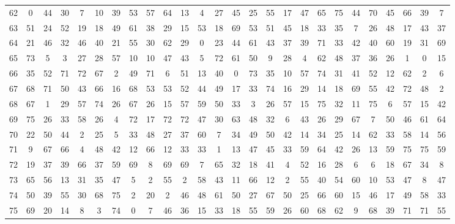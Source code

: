 \begin{table}
\begin{tabular}{c c c c c c c c c c c c c c c c c c c c c c c c c c }
62 & 0 & 44 & 30 & 7 & 10 & 39 & 53 & 57 & 64 & 13 & 4 & 27 & 45 & 25 & 55 & 17 & 47 & 65 & 75 & 44 & 70 & 45 & 66 & 39 & 7 \\
63 & 51 & 24 & 52 & 19 & 18 & 49 & 61 & 38 & 29 & 15 & 53 & 18 & 69 & 53 & 51 & 45 & 18 & 33 & 35 & 7 & 26 & 48 & 17 & 43 & 37 \\
64 & 21 & 46 & 32 & 46 & 40 & 21 & 55 & 30 & 62 & 29 & 0 & 23 & 44 & 61 & 43 & 37 & 39 & 71 & 33 & 42 & 40 & 60 & 19 & 31 & 69 \\
65 & 73 & 5 & 3 & 27 & 28 & 57 & 10 & 10 & 47 & 43 & 5 & 72 & 61 & 50 & 9 & 28 & 4 & 62 & 48 & 37 & 36 & 26 & 1 & 0 & 15 \\
66 & 35 & 52 & 71 & 72 & 67 & 2 & 49 & 71 & 6 & 51 & 13 & 40 & 0 & 73 & 35 & 10 & 57 & 74 & 31 & 41 & 52 & 12 & 62 & 2 & 6 \\
67 & 68 & 71 & 50 & 43 & 66 & 16 & 68 & 53 & 53 & 52 & 44 & 49 & 17 & 33 & 74 & 16 & 29 & 14 & 18 & 69 & 55 & 42 & 72 & 48 & 2 \\
68 & 67 & 1 & 29 & 57 & 74 & 26 & 67 & 26 & 15 & 57 & 59 & 50 & 33 & 3 & 26 & 57 & 15 & 75 & 32 & 11 & 75 & 6 & 57 & 15 & 42 \\
69 & 75 & 26 & 33 & 58 & 26 & 4 & 72 & 17 & 72 & 72 & 47 & 30 & 63 & 48 & 32 & 6 & 43 & 26 & 29 & 67 & 7 & 50 & 46 & 61 & 64 \\
70 & 22 & 50 & 44 & 2 & 25 & 5 & 33 & 48 & 27 & 37 & 60 & 7 & 34 & 49 & 50 & 42 & 14 & 34 & 25 & 14 & 62 & 33 & 58 & 14 & 56 \\
71 & 9 & 67 & 66 & 4 & 48 & 42 & 12 & 66 & 12 & 33 & 33 & 1 & 13 & 47 & 45 & 33 & 59 & 64 & 42 & 26 & 13 & 59 & 75 & 75 & 59 \\
72 & 19 & 37 & 39 & 66 & 37 & 59 & 69 & 8 & 69 & 69 & 7 & 65 & 32 & 18 & 41 & 4 & 52 & 16 & 28 & 6 & 6 & 18 & 67 & 34 & 8 \\
73 & 65 & 56 & 13 & 31 & 35 & 47 & 5 & 2 & 55 & 2 & 58 & 43 & 11 & 66 & 12 & 2 & 55 & 40 & 54 & 60 & 10 & 53 & 47 & 8 & 47 \\
74 & 50 & 39 & 55 & 30 & 68 & 75 & 2 & 20 & 2 & 46 & 48 & 61 & 50 & 27 & 67 & 50 & 25 & 66 & 60 & 15 & 46 & 17 & 49 & 58 & 33 \\
75 & 69 & 20 & 14 & 8 & 3 & 74 & 0 & 7 & 46 & 36 & 15 & 33 & 18 & 55 & 59 & 26 & 60 & 68 & 62 & 9 & 68 & 39 & 71 & 71 & 55 \\
\hline
\end{tabular}
\end{table}